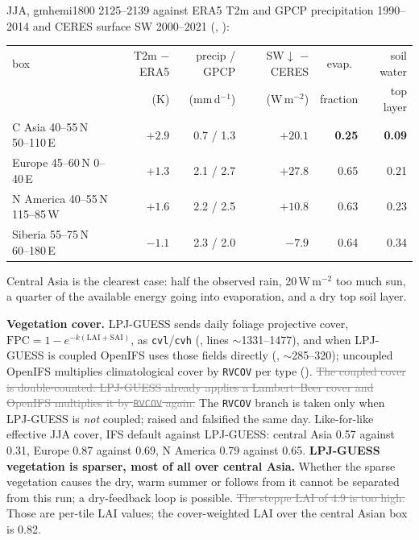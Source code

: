 \documentclass[10pt]{article}
\newcommand{\dead}[1]{\textcolor{gray}{\sout{#1}}}
\begin{document}
JJA, gmhemi1800 2125--2139 against ERA5 T2m and GPCP precipitation 1990--2014 and CERES surface
SW 2000--2021 (,
):

\begin{center}\small
\begin{tabular}{lrrrrr}
\toprule
box & T2m $-$ ERA5 & precip / GPCP & SW$\downarrow$ $-$ CERES & evap.\ & soil water \\
 & (K) & (mm\,d$^{-1}$) & (W\,m$^{-2}$) & fraction & top layer \\
\midrule
C Asia 40--55\,N 50--110\,E   & $\mathbf{+2.9}$ & 0.7 / 1.3 & $+20.1$ & \textbf{0.25} & \textbf{0.09} \\
Europe 45--60\,N 0--40\,E     & $+1.3$ & 2.1 / 2.7 & $+27.8$ & 0.65 & 0.21 \\
N America 40--55\,N 115--85\,W& $+1.6$ & 2.2 / 2.5 & $+10.8$ & 0.63 & 0.23 \\
Siberia 55--75\,N 60--180\,E  & $-1.1$ & 2.3 / 2.0 & $-7.9$  & 0.64 & 0.34 \\
\bottomrule
\end{tabular}
\end{center}

Central Asia is the clearest case: half the observed rain, 20\,W\,m$^{-2}$ too much sun, a quarter
of the available energy going into evaporation, and a dry top soil layer.

\textbf{Vegetation cover.} LPJ-GUESS sends daily foliage projective cover,
$\mathrm{FPC}=1-e^{-k(\mathrm{LAI}+\mathrm{SAI})}$, as \texttt{cvl}/\texttt{cvh}
(, lines ${\sim}$1331--1477), and when LPJ-GUESS is coupled
OpenIFS uses those fields directly (,
${\sim}$285--320); uncoupled OpenIFS multiplies climatological cover by \texttt{RVCOV} per type
(). \dead{The coupled cover is double-counted: LPJ-GUESS already applies a
Lambert--Beer cover and OpenIFS multiplies it by \texttt{RVCOV} again.} The \texttt{RVCOV} branch is
taken only when LPJ-GUESS is \emph{not} coupled; raised and falsified the same day. Like-for-like
effective JJA cover, IFS default against LPJ-GUESS: central Asia 0.57 against 0.31, Europe 0.87
against 0.69, N America 0.79 against 0.65. \textbf{LPJ-GUESS vegetation is sparser, most of all over
central Asia.} Whether the sparse vegetation causes the dry, warm summer or follows from it cannot be
separated from this run; a dry-feedback loop is possible. \dead{The steppe LAI of 4.9 is too
high.} Those are per-tile LAI values; the cover-weighted LAI over the central Asian box is 0.82.
\end{document}
